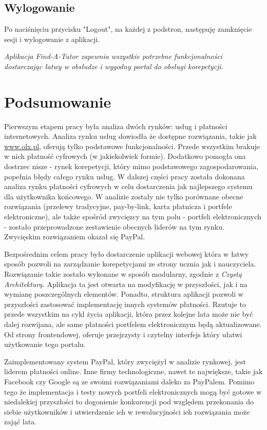 \documentclass[12pt]{article}
\numberwithin{figure}{section}
\begin{document}
\begin{sloppypar}
\subsection{Wylogowanie}
Po naciśnięciu przycisku "Logout", na każdej z podstron, następuję zamknięcie sesji i wylogowanie z aplikacji. \newline

\textit{Aplikacja Find-A-Tutor zapewnia wszystkie potrzebne funkcjonalności dostarczając łatwy w obsłudze i wygodny portal do obsługi korepetycji.}

\section{Podsumowanie}
Pierwszym etapem pracy była analiza dwóch rynków: usług i płatności internetowych. Analiza rynku usług dowiodła że dostępne rozwiązania, takie jak \url{www.olx.pl}, oferują tylko podstawowe funkcjonalności. Przede wszystkim brakuje w nich płatność cyfrowych (w jakiekolwiek formie). Dodatkowo pomogła ona dostrzec nisze - rynek korepetycji, który mimo podstawowego zagospodarowania, popełnia błędy całego rynku usług. W dalszej części pracy została dokonana analiza rynku płatności cyfrowych w celu dostarczenia jak najlepszego systemu dla użytkownika końcowego. W analizie zostały nie tylko porównane obecne rozwiązania (przelewy tradycyjne, pay-by-link, karta płatnicza i portfele elektroniczne), ale także spośród zwycięzcy na tym polu - portfeli elektronicznych - zostało przeprowadzone zestawienie obecnych liderów na tym rynku. Zwycięskim rozwiązaniem okazał się PayPal. 

Bezpośrednim celem pracy było dostarczenie aplikacji webowej która w łatwy sposób pozwoli na zarządzanie korepetycjami ze strony ucznia jak i nauczyciela. Rozwiązanie takie zostało wykonane w sposób modularny, zgodnie z \textit{Czystą Architekturą}. Aplikacja ta jest otwarta na modyfikację w przyszłości, jak i na wymianę poszczególnych elementów. Ponadto, struktura aplikacji pozwoli w przyszłości zastosować implementację innych systemów płatności. Rzutuje to przede wszystkim na cykl życia aplikacji, która przez kolejne lata może nie być dalej rozwijana, ale same płatności portfelem elektronicznym będą aktualizowane. Od strony frontendowej, oferuje przejrzysty i czytelny interfejs który ułatwi użytkowanie tego portalu. 

Zaimplementowany system PayPal, który zwyciężył w analizie rynkowej, jest liderem płatności online. Inne firmy technologiczne, nawet te największe, takie jak Facebook czy Google są ze swoimi rozwiązaniami daleko za PayPalem. Pomimo tego że implementacja i testy nowych portfeli elektronicznych mogą być gotowe w niedalekiej przyszłości to dogonienie konkurencji pod względem przekonania do siebie użytkowników i utwierdzenie ich w rewolucyjności ich rozwiązania może zająć lata.


\end{sloppypar}
\end{document}
